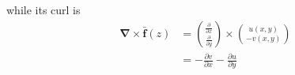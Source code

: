 \documentclass[preview]{standalone}
\begin{document}
\begin{center}
while its curl is \begin{align*} \mathbf{\nabla} \times \bar{\mathbf{f}}(z) &= {\frac{\partial}{\partial x} \choose \frac{\partial}{\partial y}} \times {u(x,y)\choose -v(x,y)} \\ &= -\frac{\partial v}{\partial x} - \frac{\partial u}{\partial y} \end{align*}
\end{center}
\end{document}
